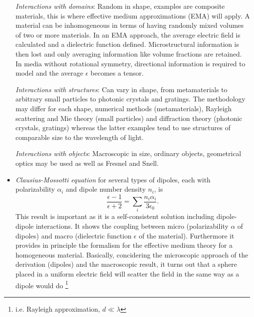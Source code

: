 \begin{itemize}
    \emph{Interactions with domains}: Random in shape, examples are composite materials, this is where effective medium approximations (EMA) will apply. A material can be inhomogeneous in terms of having randomly mixed volumes of two or more materials. In an EMA approach, the average electric field is calculated and a dielectric function defined. Microstructural information is then lost and only averaging information like volume fractions are retained. In media without rotational symmetry, directional information is required to model and the average $\epsilon$ becomes a tensor.
    
    \emph{Interactions with structures}: Can vary in shape, from metamaterials to arbitrary small particles to photonic crystals and gratings. The methodology may differ for each shape, numerical methods (metamaterials), Rayleigh scattering and Mie theory (small particles) and diffraction theory (photonic crystals, gratings) whereas the latter examples tend to use structures of comparable size to the wavelength of light.
    
    \emph{Interactions with objects}: Macroscopic in size, ordinary objects, geometrical optics may be used as well as Fresnel and Snell.
    
    \item \emph{Clausius-Mossotti equation} for several types of dipoles, each with polarizability $\alpha_i$ and dipole number density $n_i$, is
    \begin{equation}
        \frac{\epsilon-1}{\epsilon+2} = \sum_i \frac{n_i\alpha_i}{3\epsilon_0}. 
        \label{eq:clausius-mossotti}
    \end{equation}
    This result is important as it is a self-consistent solution including dipole-dipole interactions. It shows the coupling between micro (polarizability $\alpha$ of dipoles) and macro (dielectric function $\epsilon$ of the material). Furthermore it provides in principle the formalism for the effective medium theory for a homogeneous material.  Basically, concidering the microscopic approach of the derivation (dipoles) and the macroscopic result, it turns out that a sphere placed in a uniform electric field will scatter the field in the same way as a dipole would do \footnote{i.e. Rayleigh approximation, $d\ll\lambda$}
    

\end{itemize}
